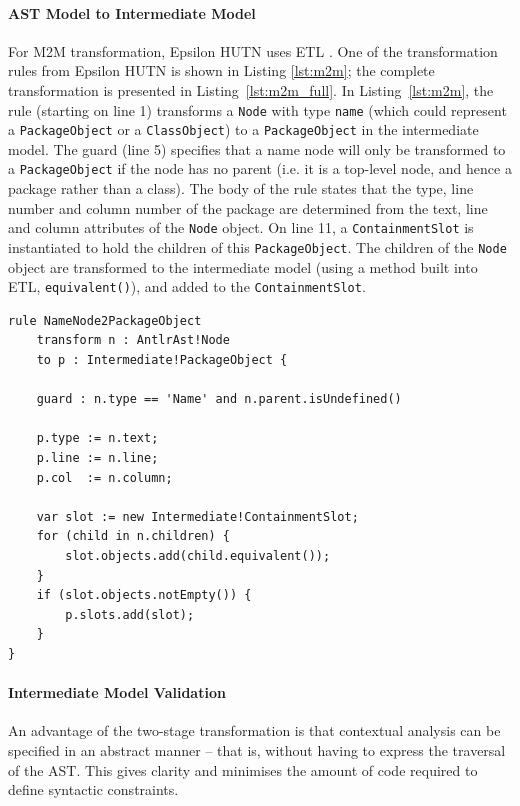 \paragraph{AST Model to Intermediate Model}
For M2M transformation, Epsilon HUTN uses ETL \cite{kolovos08etl}. One of the transformation rules from Epsilon HUTN is shown in Listing \ref{lst:m2m}; the complete transformation is presented in Listing~\ref{lst:m2m_full}. In Listing~\ref{lst:m2m}, the rule (starting on line 1) transforms a \texttt{No\-de} with type \texttt{na\-me} (which could represent a \texttt{P\-ac\-ka\-geOb\-je\-ct} or a \texttt{Cl\-a\-ssOb\-je\-ct}) to a \texttt{P\-ac\-ka\-geOb\-je\-ct} in the intermediate model. The guard (line 5) specifies that a name node will only be transformed to a \texttt{P\-ac\-ka\-geOb\-je\-ct} if the node has no parent (i.e. it is a top-level node, and hence a package rather than a class). The body of the rule states that the type, line number and column number of the package are determined from the text, line and column attributes of the \texttt{No\-de} object. On line 11, a \texttt{Co\-nt\-ai\-nm\-e\-ntSl\-ot} is instantiated to hold the children of this \texttt{P\-ac\-ka\-geOb\-je\-ct}. The children of the \texttt{No\-de} object are transformed to the intermediate model (using a method built into ETL, \texttt{eq\-ui\-va\-lent()}), and added to the \texttt{Co\-nt\-ai\-nm\-e\-ntSl\-ot}.

\begin{lstlisting}[caption=Transforming Nodes to PackageObjects with ETL., label=lst:m2m, language=ETL]
rule NameNode2PackageObject
    transform n : AntlrAst!Node
    to p : Intermediate!PackageObject {

    guard : n.type == 'Name' and n.parent.isUndefined()

    p.type := n.text;
    p.line := n.line;
    p.col  := n.column;

    var slot := new Intermediate!ContainmentSlot;
    for (child in n.children) {
        slot.objects.add(child.equivalent());
    }
    if (slot.objects.notEmpty()) {
        p.slots.add(slot);
    }
}
\end{lstlisting}

\paragraph{Intermediate Model Validation}
An advantage of the two-stage transformation is that contextual analysis can be specified in an abstract manner -- that is, without having to express the traversal of the AST. This gives clarity and minimises the amount of code required to define syntactic constraints.

